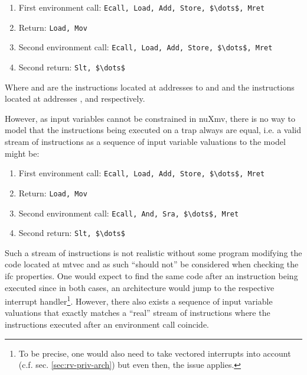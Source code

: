 \begin{enumerate}
    \item First environment call: \lstinline[language=minrv8,mathescape=true]{Ecall, Load, Add, Store, $\dots$, Mret}
    \item Return: \lstinline[language=minrv8,mathescape=true]{Load, Mov}
    \item Second environment call: \lstinline[language=minrv8,mathescape=true]{Ecall, Load, Add, Store, $\dots$, Mret}
    \item Second return: \lstinline[language=minrv8,mathescape=true]{Slt, $\dots$}
\end{enumerate}
Where  and   are the instructions located at addresses  to  and  and   the instructions located at addresses ,  and  respectively.

However, as input variables cannot be constrained in nuXmv, there is no way to model that the instructions being executed on a trap always are equal, i.e. a valid stream of instructions as a sequence of input variable valuations to the model might be:
\begin{enumerate}
    \item First environment call: \lstinline[language=minrv8,mathescape=true]{Ecall, Load, Add, Store, $\dots$, Mret}
    \item Return: \lstinline[language=minrv8,mathescape=true]{Load, Mov}
    \item Second environment call: \lstinline[language=minrv8,mathescape=true]{Ecall, And, Sra, $\dots$, Mret}
    \item Second return: \lstinline[language=minrv8,mathescape=true]{Slt, $\dots$}
\end{enumerate}

Such a stream of instructions is not realistic without some program modifying the code located at \gls{mtvec} and as such \enquote{should not} be considered when checking the \gls{ifc} properties.
One would expect to find the same code after an  instruction being executed since in both cases, an architecture would jump to the respective interrupt handler\footnote{%
    To be precise, one would also need to take vectored interrupts into account (c.f. sec. \ref{sec:rv-priv-arch}) but even then, the issue applies.
}.
However, there also exists a sequence of input variable valuations that exactly matches a \enquote{real} stream of instructions where the instructions executed after an environment call coincide.

